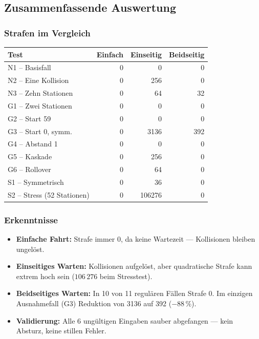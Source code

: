 \documentclass[12pt,a4paper]{article}
\begin{document}
\subsection{Zusammenfassende Auswertung}
\label{test:auswertung}

\subsubsection*{Strafen im Vergleich}
\begin{center}
\begin{tabular}{lrrr}
\toprule
\textbf{Test} & \textbf{Einfach} & \textbf{Einseitig} & \textbf{Beidseitig}\\
\midrule
N1 – Basisfall              & 0 & 0      & 0\\
N2 – Eine Kollision         & 0 & 256    & 0\\
N3 – Zehn Stationen         & 0 & 64     & 32\\
G1 – Zwei Stationen         & 0 & 0      & 0\\
G2 – Start 59               & 0 & 0      & 0\\
G3 – Start 0, symm.         & 0 & 3136   & 392\\
G4 – Abstand 1              & 0 & 0      & 0\\
G5 – Kaskade                & 0 & 256    & 0\\
G6 – Rollover               & 0 & 64     & 0\\
S1 – Symmetrisch            & 0 & 36     & 0\\
S2 – Stress (52 Stationen)  & 0 & 106276 & 0\\
\bottomrule
\end{tabular}
\end{center}

\subsubsection*{Erkenntnisse}
\begin{itemize}
  \item \textbf{Einfache Fahrt:} Strafe immer 0, da keine Wartezeit — Kollisionen bleiben ungelöst.
  \item \textbf{Einseitiges Warten:} Kollisionen aufgelöst, aber quadratische Strafe kann extrem hoch sein ($106\,276$ beim Stresstest).
  \item \textbf{Beidseitiges Warten:} In 10 von 11 regulären Fällen Strafe 0. Im einzigen Ausnahmefall (G3) Reduktion von 3136 auf 392 ($-88\,\%$).
  \item \textbf{Validierung:} Alle 6 ungültigen Eingaben sauber abgefangen — kein Absturz, keine stillen Fehler.
\end{itemize}
\end{document}
